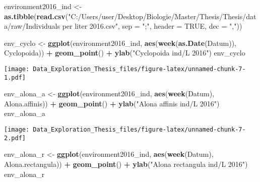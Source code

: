 \documentclass[]{article}
\newenvironment{Shaded}{\begin{snugshade}}{\end{snugshade}}
\newcommand{\KeywordTok}[1]{\textcolor[rgb]{0.13,0.29,0.53}{\textbf{#1}}}
\newcommand{\DataTypeTok}[1]{\textcolor[rgb]{0.13,0.29,0.53}{#1}}
\newcommand{\StringTok}[1]{\textcolor[rgb]{0.31,0.60,0.02}{#1}}
\newcommand{\OtherTok}[1]{\textcolor[rgb]{0.56,0.35,0.01}{#1}}
\newcommand{\OperatorTok}[1]{\textcolor[rgb]{0.81,0.36,0.00}{\textbf{#1}}}
\newcommand{\NormalTok}[1]{#1}
\begin{document}
\begin{Shaded}
\begin{Highlighting}[]
\NormalTok{environment2016_ind <-}\StringTok{ }\KeywordTok{as.tibble}\NormalTok{(}\KeywordTok{read.csv}\NormalTok{(}\StringTok{"C:/Users/user/Desktop/Biologie/Master/Thesis/Thesis/data/raw/Individuals per liter 2016.csv"}\NormalTok{, }\DataTypeTok{sep =} \StringTok{";"}\NormalTok{, }\DataTypeTok{header =} \OtherTok{TRUE}\NormalTok{, }\DataTypeTok{dec =} \StringTok{","}\NormalTok{))}

\NormalTok{env_cyclo <-}\StringTok{ }\KeywordTok{ggplot}\NormalTok{(environment2016_ind, }\KeywordTok{aes}\NormalTok{(}\KeywordTok{week}\NormalTok{(}\KeywordTok{as.Date}\NormalTok{(Datum)), Cyclopoida)) }\OperatorTok{+}
\StringTok{  }\KeywordTok{geom_point}\NormalTok{() }\OperatorTok{+}
\StringTok{  }\KeywordTok{ylab}\NormalTok{(}\StringTok{"Cyclopoida ind/L 2016"}\NormalTok{)}
\NormalTok{env_cyclo}
\end{Highlighting}
\end{Shaded}

\texttt{[image: Data\_Exploration\_Thesis\_files/figure-latex/unnamed-chunk-7-1.pdf]}

\begin{Shaded}
\begin{Highlighting}[]
\NormalTok{env_alona_a <-}\StringTok{ }\KeywordTok{ggplot}\NormalTok{(environment2016_ind, }\KeywordTok{aes}\NormalTok{(}\KeywordTok{week}\NormalTok{(Datum), Alona.affinis)) }\OperatorTok{+}
\StringTok{  }\KeywordTok{geom_point}\NormalTok{() }\OperatorTok{+}
\StringTok{  }\KeywordTok{ylab}\NormalTok{(}\StringTok{"Alona affinis ind/L 2016"}\NormalTok{)}
\NormalTok{env_alona_a}
\end{Highlighting}
\end{Shaded}

\texttt{[image: Data\_Exploration\_Thesis\_files/figure-latex/unnamed-chunk-7-2.pdf]}

\begin{Shaded}
\begin{Highlighting}[]
\NormalTok{env_alona_r <-}\StringTok{ }\KeywordTok{ggplot}\NormalTok{(environment2016_ind, }\KeywordTok{aes}\NormalTok{(}\KeywordTok{week}\NormalTok{(Datum), Alona.rectangula)) }\OperatorTok{+}
\StringTok{  }\KeywordTok{geom_point}\NormalTok{() }\OperatorTok{+}
\StringTok{  }\KeywordTok{ylab}\NormalTok{(}\StringTok{"Alona rectangula ind/L 2016"}\NormalTok{)}
\NormalTok{env_alona_r}
\end{Highlighting}
\end{Shaded}
\end{document}
